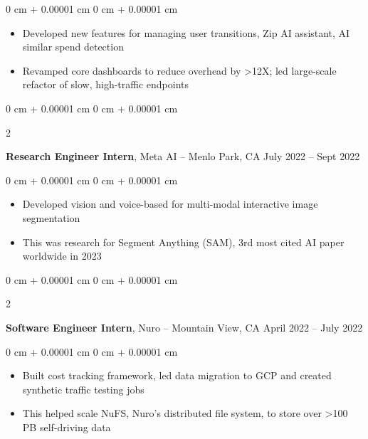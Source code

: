 \documentclass[10pt, letterpaper]{article}
\newenvironment{highlights}{
    \begin{itemize}[
        topsep=0.10 cm,
        parsep=0.10 cm,
        partopsep=0pt,
        itemsep=0pt,
        leftmargin=0 cm + 10pt
    ]
}{
    \end{itemize}
} %
\newenvironment{onecolentry}{
    \begin{adjustwidth}{
        0 cm + 0.00001 cm
    }{
        0 cm + 0.00001 cm
    }
}{
    \end{adjustwidth}
} %
\newenvironment{twocolentry}[2][]{
    \onecolentry
    \def\secondColumn{#2}
    \setcolumnwidth{\fill, 4.5 cm}
    \begin{paracol}{2}
}{
    \switchcolumn \raggedleft \secondColumn
    \end{paracol}
    \endonecolentry
} %
\begin{document}
        \vspace{0.10 cm}
        \begin{onecolentry}
            \begin{highlights}
                \item Developed new features for managing user transitions, Zip AI assistant, AI similar spend detection
                \item Revamped core dashboards to reduce overhead by >12X; led large-scale refactor of slow, high-traffic endpoints

            \end{highlights}
        \end{onecolentry}


        \vspace{0.2 cm}

        \begin{twocolentry}{
            July 2022 – Sept 2022
        }
            \textbf{Research Engineer Intern}, Meta AI -- Menlo Park, CA\end{twocolentry}

        \vspace{0.10 cm}
        \begin{onecolentry}
            \begin{highlights}
                \item Developed vision and voice-based for multi-modal interactive image segmentation
                \item This was research for Segment Anything (SAM), 3rd most cited AI paper worldwide in 2023
            \end{highlights}
        \end{onecolentry}

        \vspace{0.2 cm}


        \begin{twocolentry}{
            April 2022 – July 2022
        }
            \textbf{Software Engineer Intern}, Nuro -- Mountain View, CA\end{twocolentry}

        \vspace{0.10 cm}
        \begin{onecolentry}
            \begin{highlights}
                \item Built cost tracking framework, led data migration to GCP and created synthetic traffic testing jobs
                \item This helped scale NuFS, Nuro's distributed file system, to store over >100 PB self-driving data
            \end{highlights}
        \end{onecolentry}
\end{document}
